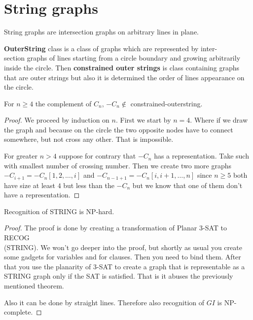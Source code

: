 \chapter{String graphs}

\begin{defn}
	String graphs are intersection graphs on arbitrary lines in plane.
\end{defn}

\begin{defn}
	\textbf{OuterString} class is a class of graphs which are represented by inter-\\section graphs of lines starting from a circle boundary and growing arbitrarily inside the circle. Then \textbf{constrained outer strings} is class containing graphs that are outer strings but also it is determined the order of lines appearance on the circle.
\end{defn}


\begin{thm}
	For $n \geq 4$ the complement of $C_n$, $-C_n \notin$ constrained-outerstring.
\end{thm}

\begin{proof}
	We proceed by induction on $n$. First we start by $n = 4$. Where if we draw the graph and because on the circle the two opposite nodes have to connect somewhere, but not cross any other. That is impossible.
	
	For greater $n > 4$ suppose for contrary that $-C_n$ has a representation. Take such with smallest number of crossing number. Then we create two more graphs $-C_{i+1} = -C_n[1,2, \dots, i]$ and $-C_{n-1+1} = -C_n[i, i+1, \dots, n]$ since $n \geq 5$ both have size at least $4$ but less than the $-C_n$ but we know that one of them don't have a representation.
\end{proof}

\begin{thm}
	Recognition of STRING is NP-hard.
\end{thm}

\begin{proof}
	The proof is done by creating a transformation of Planar 3-SAT to RECOG\\(STRING). We won't go deeper into the proof, but shortly as usual you create some gadgets for variables and for clauses. Then you need to bind them. After that you use the planarity of 3-SAT to create a graph that is representable as a STRING graph only if the SAT is satisfied. That is it abuses the previously mentioned theorem.
	
	Also it can be done by straight lines. Therefore also recognition of $GI$ is NP-complete.
\end{proof}

